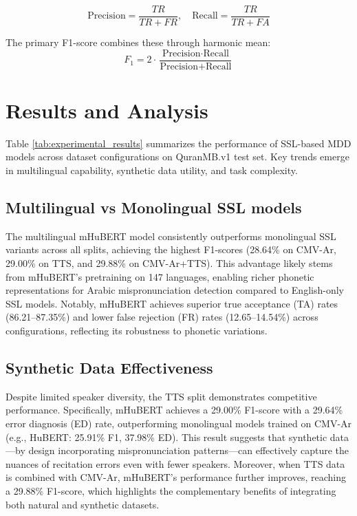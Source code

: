 \documentclass{Interspeech}
\begin{document}
\begin{equation}
\text{Precision} = \frac{TR}{TR + FR}, \quad 
\text{Recall} = \frac{TR}{TR + FA}
\end{equation}

The primary F1-score combines these through harmonic mean:
\begin{equation}
F_1 = 2\cdot\frac{\text{Precision} \cdot \text{Recall}}{\text{Precision} + \text{Recall}}
\end{equation}



\section{Results and Analysis}
\label{sec:results }

Table \ref{tab:experimental_results} summarizes the performance of SSL-based MDD models across dataset configurations on QuranMB.v1 test set. Key trends emerge in multilingual capability, synthetic data utility, and task complexity.

\subsection{Multilingual vs Monolingual SSL models}
The multilingual mHuBERT model consistently outperforms monolingual SSL variants across all splits, achieving the highest F1-scores (28.64\% on CMV-Ar, 29.00\% on TTS, and 29.88\% on CMV-Ar+TTS). This advantage likely stems from mHuBERT’s pretraining on 147 languages, enabling richer phonetic representations for Arabic mispronunciation detection compared to English-only SSL models. Notably, mHuBERT achieves superior true acceptance (TA) rates (86.21–87.35\%) and lower false rejection (FR) rates (12.65–14.54\%) across configurations, reflecting its robustness to phonetic variations.


\subsection{Synthetic Data Effectiveness} Despite limited speaker diversity, the TTS split demonstrates competitive performance. Specifically, mHuBERT achieves a 29.00\% F1-score with a 29.64\% error diagnosis (ED) rate, outperforming monolingual models trained on CMV-Ar (e.g., HuBERT: 25.91\% F1, 37.98\% ED). This result suggests that synthetic data—by design incorporating mispronunciation patterns—can effectively capture the nuances of recitation errors even with fewer speakers. Moreover, when TTS data is combined with CMV-Ar, mHuBERT's performance further improves, reaching a 29.88\% F1-score, which highlights the complementary benefits of integrating both natural and synthetic datasets.
\end{document}

